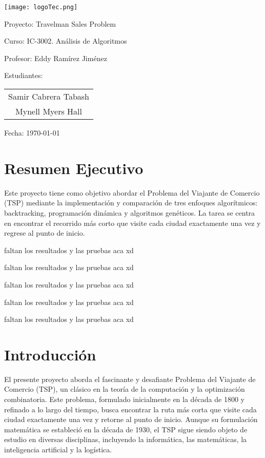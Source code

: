 \documentclass{article}
\begin{document}
	
	\begin{titlepage}
		\centering
		
		\texttt{[image: logoTec.png]}
		
		\vspace{2cm}
		{\LARGE Proyecto: Travelman Sales Problem \par}
		
		\vspace{1cm}
		{\large Curso: IC-3002. Análisis de Algoritmos \par}
		{\large Profesor: Eddy Ramírez Jiménez \par}
		
		\vspace{1cm}
		{\large Estudiantes: \par}
		\begin{tabular}{c}
			Samir Cabrera Tabash \\
			Mynell Myers Hall \\
		\end{tabular}
		
		\vspace{1cm}
		{\large Fecha: \today \par}
	\end{titlepage}
	
	\tableofcontents
	\newpage
	
	\section{Resumen Ejecutivo}
	Este proyecto tiene como objetivo abordar el Problema del Viajante de Comercio (TSP) mediante la implementación y comparación de tres enfoques algorítmicos: backtracking, programación dinámica y algoritmos genéticos. La tarea se centra en encontrar el recorrido más corto que visite cada ciudad exactamente una vez y regrese al punto de inicio.
	
	
	faltan los resultados y las pruebas aca xd
	
	faltan los resultados y las pruebas aca xd
	
	faltan los resultados y las pruebas aca xd
	
	faltan los resultados y las pruebas aca xd
	
	faltan los resultados y las pruebas aca xd
	
	
	
	\section{Introducción}
	El presente proyecto aborda el fascinante y desafiante Problema del Viajante de Comercio (TSP), un clásico en la teoría de la computación y la optimización combinatoria. Este problema, formulado inicialmente en la década de 1800 y refinado a lo largo del tiempo, busca encontrar la ruta más corta que visite cada ciudad exactamente una vez y retorne al punto de inicio. Aunque su formulación matemática se estableció en la década de 1930, el TSP sigue siendo objeto de estudio en diversas disciplinas, incluyendo la informática, las matemáticas, la inteligencia artificial y la logística.
	
\end{document}
